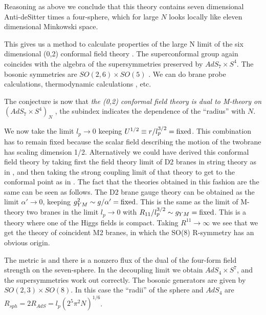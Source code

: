 Reasoning as above we conclude that this theory  contains seven
dimensional Anti-deSitter times a four-sphere, which for large $N$ looks
locally like eleven dimensional Minkowski space. 

This gives us a method to calculate properties of the large N limit 
of the six dimensional (0,2) conformal field theory \swsix . 
The superconformal group again coincides with the algebra of the 
supersymmetries preserved by $AdS_7 \times S^4$. The bosonic symmetries
are $SO(2,6)\times SO(5)$ \nahm . 
We can do brane probe calculations, thermodynamic calculations \kt , etc.

The conjecture is now that {\it the (0,2) conformal field theory is dual
to M-theory on $(AdS_7 \times S^4)_{N}$ }, the subindex indicates the 
dependence of the ``radius'' with $N$. 




We now  take the limit $l_p \to 0$ keeping  $U^{1/2} \equiv 
r/l_p^{3/2} = {\rm fixed}$. This combination 
has to remain fixed because  the scalar field describing
the motion of the twobrane has scaling dimension 1/2. 
Alternatively we could have derived this conformal field theory by taking
first the field theory limit of D2 branes in string theory  as in ,
 and then 
taking the strong coupling limit of that theory to get to the conformal 
point as in . 
The fact that the theories obtained in this fashion are the same can 
be seen as follows. 
The D2 brane gauge theory can be obtained as
the limit $ \alpha' \to 0$, keeping $g^2_{YM} \sim g/\alpha' = 
{\rm fixed}$.
This is the same as the limit of M-theory two branes in the limit
$l_p \to 0$ with  $R_{11}/l_p^{3/2} \sim g_{YM} = {\rm fixed}$.
This is a theory where one of the Higgs fields is compact. 
Taking $R^{11} \to \infty $ we see that we get the theory of coincident
M2 branes, in which  the SO(8) R-symmetry has an obvious origin.




The metric is 
\eqn{}
and there is a nonzero flux of the dual of the four-form field strength
on the seven-sphere. 
In the decoupling limit we obtain  $AdS_4\times S^7$, and
the supersymmetries work out correctly. The bosonic generators
are given by $SO(2,3)\times SO(8)$. In this case the ``radii'' of the
sphere and $AdS_4$ are  $R_{sph} = 2 R_{AdS} =  l_p ( 2^5 \pi^2 N)^{1/6}$.


